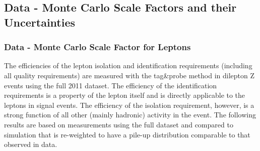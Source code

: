 \subsection{Data - Monte Carlo Scale Factors and their Uncertainties}
\label{sec:SF}

\subsubsection{Data - Monte Carlo Scale Factor for Leptons}
\label{sec:tnp}

The efficiencies of the lepton isolation and identification requirements (including all quality requirements) 
are measured with the tag\&probe method in dilepton Z events using the full 2011 dataset.
The efficiency of the identification requirements is a property of the lepton itself and is directly applicable
 to the leptons in signal events.
The efficiency of the isolation requirement, however, is a strong function of all other (mainly hadronic)
activity in the event.
The following results are based on measurements using the full dataset and compared 
to simulation that is re-weighted to have a pile-up distribution comparable to that observed in data.

